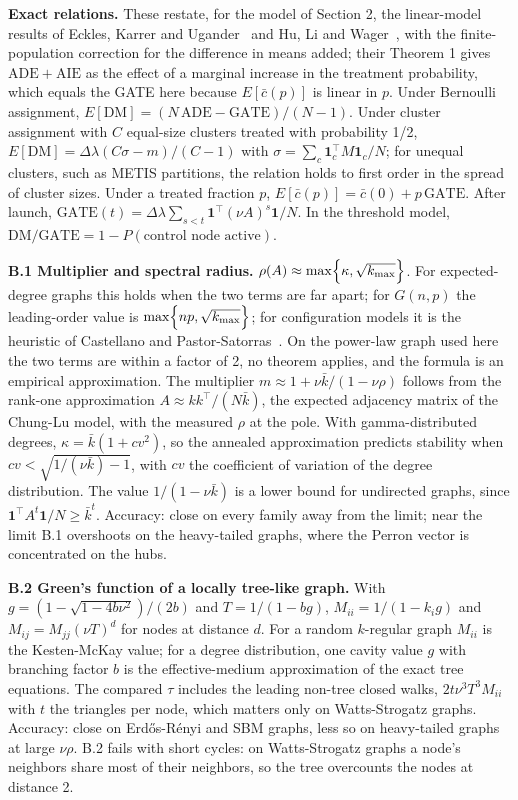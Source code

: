 \documentclass[final,5p,times,twocolumn,number]{elsarticle}
\begin{document}
\textbf{Exact relations.} These restate, for the model of Section 2, the linear-model results of Eckles, Karrer and Ugander~\cite[eqs. 6 to 9 and 11]{r8} and Hu, Li and Wager~\cite[Example 2 and Theorem 1]{r12}, with the finite-population correction for the difference in means added; their Theorem 1 gives $\mathrm{ADE} + \mathrm{AIE}$  as the effect of a marginal increase in the treatment probability, which equals the GATE here because $E[\bar c(p)]$  is linear in $p$. Under Bernoulli assignment, $E[\mathrm{DM}] = (N\,\mathrm{ADE} - \mathrm{GATE})/(N - 1)$. Under cluster assignment with $C$  equal-size clusters treated with probability 1/2, $E[\mathrm{DM}] = \Delta\lambda(C\sigma - m)/(C - 1)$  with $\sigma = \sum_c \mathbf{1}_c^{\top}M\mathbf{1}_c/N$; for unequal clusters, such as METIS partitions, the relation holds to first order in the spread of cluster sizes. Under a treated fraction $p$, $E[\bar c(p)] = \bar c(0) + p\,\mathrm{GATE}$. After launch, $\mathrm{GATE}(t) = \Delta\lambda\sum_{s<t}\mathbf{1}^{\top}(\nu A)^s\mathbf{1}/N$. In the threshold model, $\mathrm{DM}/\mathrm{GATE} = 1 - P(\text{control node active})$.


\textbf{B.1 Multiplier and spectral radius.} $\rho(A) \approx \max\Bigl\{\kappa, \sqrt{k_{\max}}\Bigr\}$. For expected-degree graphs this holds when the two terms are far apart; for $G(n, p)$  the leading-order value is $\max\Bigl\{np, \sqrt{k_{\max}}\Bigr\}$; for configuration models it is the heuristic of Castellano and Pastor-Satorras~\cite{r5}. On the power-law graph used here the two terms are within a factor of 2, no theorem applies, and the formula is an empirical approximation. The multiplier $m \approx 1 + \nu\bar k/(1 - \nu\rho)$  follows from the rank-one approximation $A \approx kk^{\top}/(N\bar k)$, the expected adjacency matrix of the Chung-Lu model, with the measured $\rho$  at the pole. With gamma-distributed degrees, $\kappa = \bar k(1 + cv^2)$, so the annealed approximation predicts stability when $cv < \sqrt{1/(\nu\bar k) - 1}$, with $cv$  the coefficient of variation of the degree distribution. The value $1/(1 - \nu\bar k)$  is a lower bound for undirected graphs, since $\mathbf{1}^{\top}A^t\mathbf{1}/N \geq \bar k^t$. Accuracy: close on every family away from the limit; near the limit B.1 overshoots on the heavy-tailed graphs, where the Perron vector is concentrated on the hubs.


\textbf{B.2 Green's function of a locally tree-like graph.} With $g = (1 - \sqrt{1 - 4b\nu^2})/(2b)$  and $T = 1/(1 - bg)$, $M_{ii} = 1/(1 - k_i g)$  and $M_{ij} = M_{jj}(\nu T)^d$  for nodes at distance $d$. For a random $k$-regular graph $M_{ii}$  is the Kesten-McKay value; for a degree distribution, one cavity value $g$  with branching factor $b$  is the effective-medium approximation of the exact tree equations. The compared $\tau$  includes the leading non-tree closed walks, $2t\nu^3T^3M_{ii}$  with $t$  the triangles per node, which matters only on Watts-Strogatz graphs. Accuracy: close on Erdős-Rényi and SBM graphs, less so on heavy-tailed graphs at large $\nu\rho$. B.2 fails with short cycles: on Watts-Strogatz graphs a node's neighbors share most of their neighbors, so the tree overcounts the nodes at distance 2.
\end{document}
